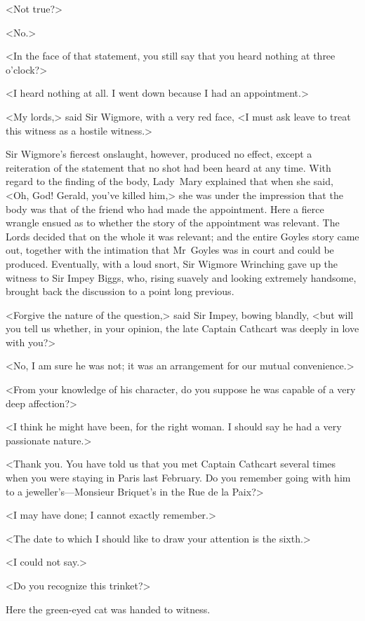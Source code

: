 <Not true?>

<No.>

<In the face of that statement, you still say that you heard nothing at three o'clock?>

<I heard nothing at all. I went down because I had an appointment.>

<My lords,> said Sir Wigmore, with a very red face, <I must ask leave to treat this witness as a hostile witness.>

Sir Wigmore's fiercest onslaught, however, produced no effect, except a reiteration of the statement that no shot had been heard at any time. With regard to the finding of the body, Lady~Mary explained that when she said, <Oh, God! Gerald, you've killed him,> she was under the impression that the body was that of the friend who had made the appointment. Here a fierce wrangle ensued as to whether the story of the appointment was relevant. The Lords decided that on the whole it was relevant; and the entire Goyles story came out, together with the intimation that Mr~Goyles was in court and could be produced.  Eventually, with a loud snort, Sir Wigmore Wrinching gave up the witness to Sir Impey Biggs, who, rising suavely and looking extremely handsome, brought back the discussion to a point long previous.

<Forgive the nature of the question,> said Sir Impey, bowing blandly, <but will you tell us whether, in your opinion, the late Captain Cathcart was deeply in love with you?>

<No, I am sure he was not; it was an arrangement for our mutual convenience.>

<From your knowledge of his character, do you suppose he was capable of a very deep affection?>

<I think he might have been, for the right woman. I should say he had a very passionate nature.>

<Thank you. You have told us that you met Captain Cathcart several times when you were staying in Paris last February. Do you remember going with him to a jeweller's—Monsieur Briquet's in the Rue de la Paix?>

<I may have done; I cannot exactly remember.>

<The date to which I should like to draw your attention is the sixth.>

<I could not say.>

<Do you recognize this trinket?>

Here the green-eyed cat was handed to witness.

